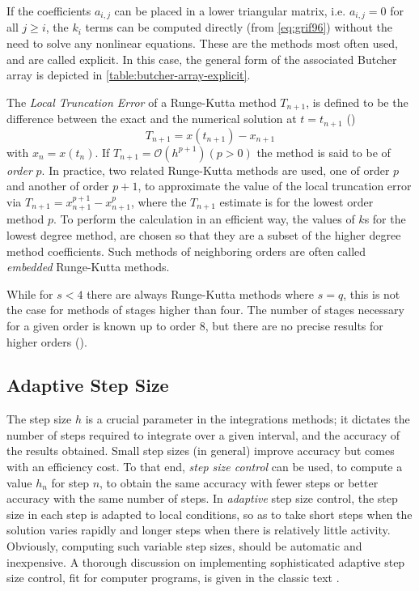 If the coefficients $a_{i,j}$ can be placed in a lower triangular matrix, i.e. 
$a_{i,j} = 0$ for all $j \ge i$, the $k_i$ terms can be computed directly (from 
\autoref{eq:grif96}) without the need to solve any nonlinear equations. These are 
the methods most often used, and are called explicit. In this case, the general form 
of the associated Butcher array is depicted in \autoref{table:butcher-array-explicit}.

The \emph{Local Truncation Error} of a Runge-Kutta method $T_{n+1}$, is defined 
to be the difference between the exact and the numerical solution at $t=t_{n+1}$
(\cite{Griffiths2010})
\begin{equation}
    T_{n+1} = x(t_{n+1}) - x_{n+1}
\end{equation}
with $x_n = x(t_n)$. If $T_{n+1} = \mathcal{O}(h^{p+1})(p>0)$ the method is 
said to be of \emph{order} $p$. In practice, two related Runge-Kutta methods are 
used, one of order $p$ and another of order $p+1$, to approximate the value of 
the local truncation error via $T_{n+1} = x^{p+1}_{n+1} - x^{p}_{n+1}$, where the 
$T_{n+1}$ estimate is for the lowest order method $p$. To perform the calculation 
in an efficient way, the values of $k$s for the lowest degree method, are chosen 
so that they are a subset of the higher degree method coefficients. Such methods 
of neighboring orders are often called \emph{embedded} Runge-Kutta methods.

While for $s<4$ there are always Runge-Kutta methods where $s=q$, this is not the 
case for methods of stages higher than four. The number of stages necessary for 
a given order is known up to order 8, but there are no precise results for higher 
orders (\cite{Griffiths2010}).

\subsection{Adaptive Step Size}\label{ssec:adaptive-step-size}

The step size $h$ is a crucial parameter in the integrations methods; it dictates 
the number of steps required to integrate over a given interval, and the accuracy 
of the results obtained. Small step sizes (in general) improve accuracy but comes 
with an efficiency cost. To that end, \emph{step size control} can be used, to 
compute a value $h_n$ for step $n$, to obtain the same accuracy with fewer steps 
or better accuracy with the same number of steps. In \emph{adaptive} step size control,
the step size in each step is adapted to local conditions, so as to take short steps 
when the solution varies rapidly and longer steps when there is relatively little 
activity. Obviously, computing such variable step sizes, should be automatic and 
inexpensive. A thorough discussion on implementing sophisticated adaptive step size 
control, fit for computer programs, is given in the classic text \cite{Shampine1975}.
